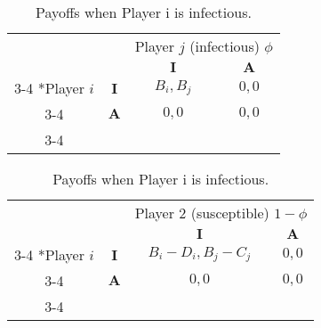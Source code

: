 \documentclass{article}
\theoremstyle{definition}
\theoremstyle{exercise}
\theoremstyle{remark}
\begin{document}
  \begin{table}[H]
      \centering
    \begin{minipage}{.5\textwidth}
    \setlength{\extrarowheight}{2pt}
    \begin{tabular}{cc|c|c|}
        & \multicolumn{1}{c}{} & \multicolumn{2}{c}{Player $j$ (infectious) $\phi$}\\
      & \multicolumn{1}{c}{} & \multicolumn{1}{c}{$\bm{I}$}  & \multicolumn{1}{c}{$\bm{A}$} \\\cline{3-4}
        \multirow{2}*{Player $i$ }  & $\bm{I}$ & $B_i, B_j$ & $0,0$ \\\cline{3-4}
        & $\bm{A}$ & $0,0$ & $0,0$ \\\cline{3-4}
    \end{tabular}
    \end{minipage}%
    \begin{minipage}{.5\textwidth}
    \setlength{\extrarowheight}{2pt}
    \begin{tabular}{cc|c|c|}
        & \multicolumn{1}{c}{} & \multicolumn{2}{c}{Player $2$ (susceptible) $1 - \phi$}\\
      & \multicolumn{1}{c}{} & \multicolumn{1}{c}{$\bm{I}$}  & \multicolumn{1}{c}{$\bm{A}$} \\\cline{3-4}
        \multirow{2}*{Player $i$}  & $\bm{I}$ & $B_i - D_i, B_j - C_j$ & $0,0$ \\\cline{3-4}
        & $\bm{A}$ & $0,0$ & $0,0$ \\\cline{3-4}
    \end{tabular}
    \end{minipage}
      \caption{Payoffs when Player i is infectious.}
  \end{table}
\end{document}
